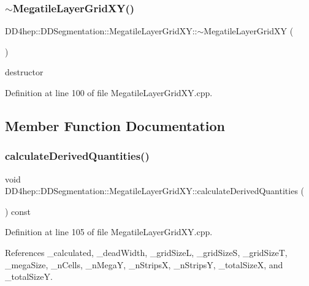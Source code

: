 \subsubsection{\texorpdfstring{$\sim$\+Megatile\+Layer\+Grid\+X\+Y()}{~MegatileLayerGridXY()}}
{\footnotesize\ttfamily D\+D4hep\+::\+D\+D\+Segmentation\+::\+Megatile\+Layer\+Grid\+X\+Y\+::$\sim$\+Megatile\+Layer\+Grid\+XY (\begin{DoxyParamCaption}{ }\end{DoxyParamCaption})\hspace{0.3cm}{\ttfamily [virtual]}}



destructor 



Definition at line 100 of file Megatile\+Layer\+Grid\+X\+Y.\+cpp.



\subsection{Member Function Documentation}
\hypertarget{class_d_d4hep_1_1_d_d_segmentation_1_1_megatile_layer_grid_x_y_ad569c63f36618b49bbacdda3ab9af6b5}{}\label{class_d_d4hep_1_1_d_d_segmentation_1_1_megatile_layer_grid_x_y_ad569c63f36618b49bbacdda3ab9af6b5} 
\subsubsection{\texorpdfstring{calculate\+Derived\+Quantities()}{calculateDerivedQuantities()}}
{\footnotesize\ttfamily void D\+D4hep\+::\+D\+D\+Segmentation\+::\+Megatile\+Layer\+Grid\+X\+Y\+::calculate\+Derived\+Quantities (\begin{DoxyParamCaption}{ }\end{DoxyParamCaption}) const\hspace{0.3cm}{\ttfamily [protected]}}



Definition at line 105 of file Megatile\+Layer\+Grid\+X\+Y.\+cpp.



References \+\_\+calculated, \+\_\+dead\+Width, \+\_\+grid\+SizeL, \+\_\+grid\+SizeS, \+\_\+grid\+SizeT, \+\_\+mega\+Size, \+\_\+n\+Cells, \+\_\+n\+MegaY, \+\_\+n\+StripsX, \+\_\+n\+StripsY, \+\_\+total\+SizeX, and \+\_\+total\+SizeY.




